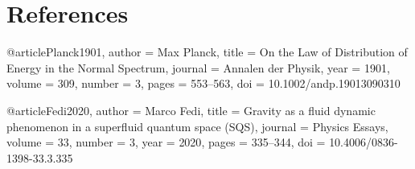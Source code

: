 \documentclass[12pt]{article}
\begin{document}
\section*{References}


@article{Planck1901,
  author = {Max Planck},
  title = {On the Law of Distribution of Energy in the Normal Spectrum},
  journal = {Annalen der Physik},
  year = {1901},
  volume = {309},
  number = {3},
  pages = {553--563},
  doi = {10.1002/andp.19013090310}
}

@article{Fedi2020,
  author = {Marco Fedi},
  title = {Gravity as a fluid dynamic phenomenon in a superfluid quantum space (SQS)},
  journal = {Physics Essays},
  volume = {33},
  number = {3},
  year = {2020},
  pages = {335--344},
  doi = {10.4006/0836-1398-33.3.335}
}
\end{document}
